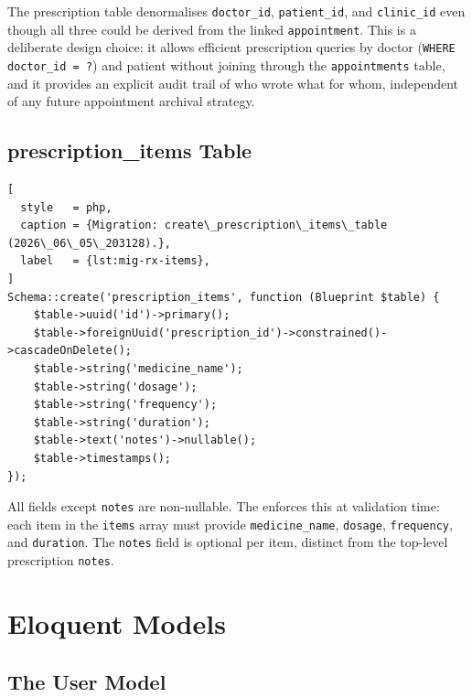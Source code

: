 The prescription table denormalises \texttt{doctor\_id},
\texttt{patient\_id}, and \texttt{clinic\_id} even though all three
could be derived from the linked \texttt{appointment}. This is a
deliberate design choice: it allows efficient prescription queries by
doctor (\texttt{WHERE doctor\_id = ?}) and patient without joining
through the \texttt{appointments} table, and it provides an explicit
audit trail of who wrote what for whom, independent of any future
appointment archival strategy.

\subsection{prescription\_items Table}

\begin{lstlisting}[
  style   = php,
  caption = {Migration: create\_prescription\_items\_table (2026\_06\_05\_203128).},
  label   = {lst:mig-rx-items},
]
Schema::create('prescription_items', function (Blueprint $table) {
    $table->uuid('id')->primary();
    $table->foreignUuid('prescription_id')->constrained()->cascadeOnDelete();
    $table->string('medicine_name');
    $table->string('dosage');
    $table->string('frequency');
    $table->string('duration');
    $table->text('notes')->nullable();
    $table->timestamps();
});
\end{lstlisting}

All fields except \texttt{notes} are non-nullable. The
 enforces this at validation time:
each item in the \texttt{items} array must provide
\texttt{medicine\_name}, \texttt{dosage}, \texttt{frequency}, and
\texttt{duration}. The \texttt{notes} field is optional per item,
distinct from the top-level prescription \texttt{notes}.

\section{Eloquent Models}
\label{sec:models}

\subsection{The User Model}

